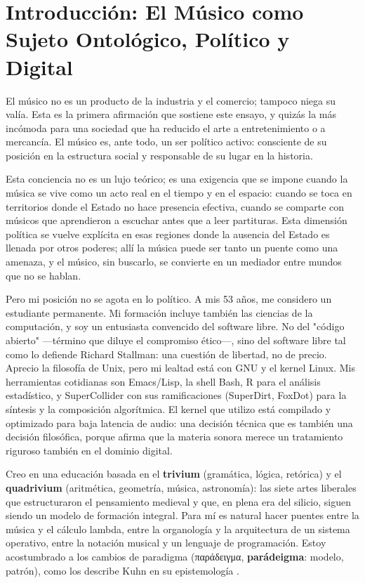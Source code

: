 \documentclass[14pt, a4paper]{article}
\begin{document}
\section{Introducción: El Músico como Sujeto Ontológico, Político y Digital}
\label{introduccion}
El músico no es un producto de la industria y el comercio; tampoco
niega su valía. Esta es la primera afirmación que sostiene este
ensayo, y quizás la más incómoda para una sociedad que ha reducido el
arte a entretenimiento o a mercancía. El músico es, ante todo, un ser
político activo: consciente de su posición en la estructura social y
responsable de su lugar en la historia.

Esta conciencia no es un lujo teórico; es una exigencia que se impone
cuando la música se vive como un acto real en el tiempo y en el
espacio: cuando se toca en territorios donde el Estado no hace
presencia efectiva, cuando se comparte con músicos que aprendieron a
escuchar antes que a leer partituras. Esta dimensión política se
vuelve explícita en esas regiones donde la ausencia del Estado es
llenada por otros poderes; allí la música puede ser tanto un puente
como una amenaza, y el músico, sin buscarlo, se convierte en un
mediador entre mundos que no se hablan.

Pero mi posición no se agota en lo político. A mis 53 años, me
considero un estudiante permanente. Mi formación incluye también las
ciencias de la computación, y soy un entusiasta convencido del
software libre. No del "código abierto" —término que diluye el
compromiso ético—, sino del software libre tal como lo defiende
Richard Stallman: una cuestión de libertad, no de precio. Aprecio la
filosofía de Unix, pero mi lealtad está con GNU y el kernel Linux.
Mis herramientas cotidianas son Emacs/Lisp, la shell Bash, R para el
análisis estadístico, y SuperCollider con sus ramificaciones
(SuperDirt, FoxDot) para la síntesis y la composición algorítmica. El
kernel que utilizo está compilado y optimizado para baja latencia de
audio: una decisión técnica que es también una decisión filosófica,
porque afirma que la materia sonora merece un tratamiento riguroso
también en el dominio digital.

Creo en una educación basada en el \textbf{trivium} (gramática, lógica,
retórica) y el \textbf{quadrivium} (aritmética, geometría, música,
astronomía): las siete artes liberales que estructuraron el
pensamiento medieval y que, en plena era del silicio, siguen siendo
un modelo de formación integral. Para mí es natural hacer puentes
entre la música y el cálculo lambda, entre la organología y la
arquitectura de un sistema operativo, entre la notación musical y un
lenguaje de programación. Estoy acostumbrado a los cambios de
paradigma (παράδειγμα, \textbf{parádeigma}: modelo, patrón), como los
describe Kuhn en su epistemología \autocite{kuhn1962}.
\end{document}

